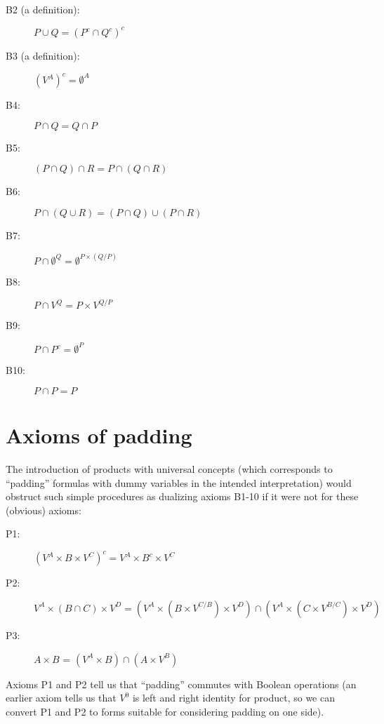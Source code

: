 \begin{description}

\item[B2 (a definition):]  $P \cup Q = (P^c\cap Q^c)^c$

\item[B3 (a definition):]  $(V^A)^c = \emptyset^A$
\item[B4:]  $P\cap Q = Q\cap P$

\item[B5:]  $(P\cap Q)\cap R = P\cap (Q\cap R)$

\item[B6:]  $P\cap (Q\cup R) = (P\cap Q) \cup (P\cap R)$

\item[B7:]  $P\cap \emptyset^Q = \emptyset^{P\times(Q/P)}$

\item[B8:]  $P\cap V^Q = P\times V^{Q/P}$

\item[B9:]  $P\cap P^c = \emptyset^P$

\item[B10:]  $P\cap P = P$

\end{description}

\section{Axioms of padding}

The introduction of products with universal concepts (which
corresponds to ``padding'' formulas with dummy variables in the
intended interpretation) would obstruct such simple procedures as dualizing axioms B1-10 if it were not for these (obvious) axioms:

\begin{description}

\item[P1:]  $(V^A \times B \times V^C)^c = V^A \times B^c \times V^C$

\item[P2:] $V^A \times (B \cap C) \times V^D = (V^A \times (B\times
V^{C/B}) \times V^D) \cap (V^A \times (C\times V^{B/C}) \times V^D)$

\item [P3:]  $A \times B$ = $(V^A \times B) \cap (A \times V^B)$

\end{description}

Axioms P1 and P2 tell us that ``padding'' commutes with Boolean
operations (an earlier axiom tells us that $V^0$ is left and right
identity for product, so we can convert P1 and P2 to forms suitable
for considering padding on one side).

